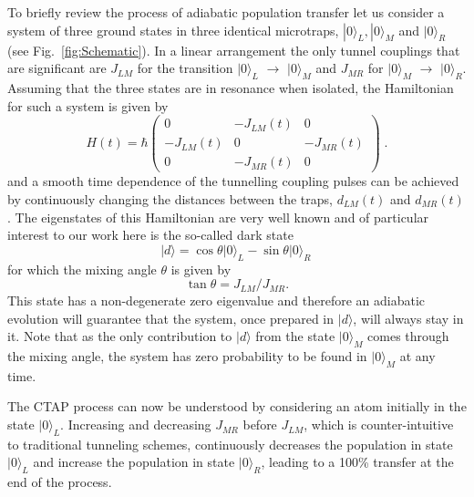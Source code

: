 To briefly review the process of adiabatic population transfer let us
consider a system of three ground states in three identical
microtraps, $|0\rangle_L, |0\rangle_M$ and $|0\rangle_R$ (see
Fig.~\ref{fig:Schematic}). In a linear arrangement the only tunnel
couplings that are significant are $J_{LM}$ for the transition $\vert
0 \rangle_L$ $\to$ $\vert 0 \rangle_M$ and $J_{MR}$ for $\vert 0
\rangle_M$ $\to$ $\vert 0 \rangle_R$. Assuming that the three states
are in resonance when isolated, the Hamiltonian for such a system is
given by
\begin{equation}
  \label{eq:wgHamiltonian}
  H(t)=\hbar
    \left(\begin{array}{ccc}
    0             & -J_{LM}(t) & 0  \\
    -J_{LM}(t)  & 0            & -J_{MR}(t) \\
    0             & -J_{MR}(t) & 0  
  \end{array}\right) \;.
\end{equation}
and a smooth time dependence of the tunnelling coupling pulses can be
achieved by continuously changing the distances between the traps,
$d_{LM}(t)$ and $d_{MR}(t)$. The eigenstates of this Hamiltonian are
very well known \cite{Bergmann:98} and of particular interest to our
work here is the so-called dark state
\begin{equation}
  |d\rangle=\cos\theta|0\rangle_L-\sin\theta|0\rangle_R\,
\end{equation}
for which the  mixing angle $\theta$ is given by
\begin{equation}
  \tan\theta=J_{LM}/J_{MR}.
\end{equation}
This state has a non-degenerate zero eigenvalue and therefore an
adiabatic evolution will guarantee that the system, once prepared in
$|d\rangle$, will always stay in it. Note that as the only
contribution to $|d \rangle$ from the state $|0\rangle_M$ comes
through the mixing angle, the system has zero probability to be found
in $|0\rangle_M$ at any time.

The CTAP process can now be understood by considering an atom
initially in the state $|0\rangle_L$. Increasing and decreasing
$J_{MR}$ before $J_{LM}$, which is counter-intuitive to traditional
tunneling schemes, continuously decreases the population in state
$|0\rangle_L$ and increase the population in state $|0\rangle_R$,
leading to a 100\% transfer at the end of the process.

